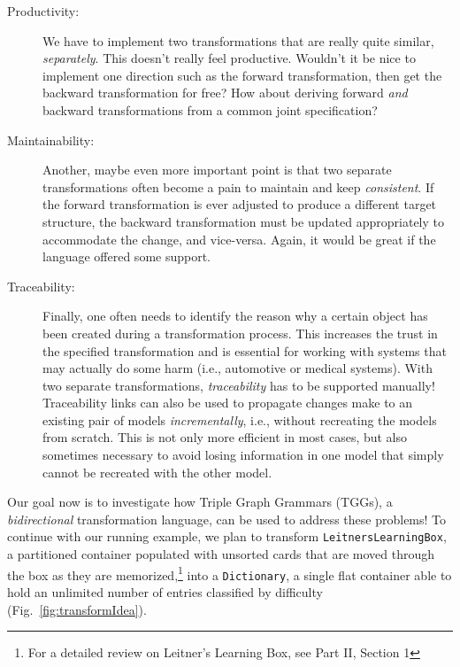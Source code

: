 \begin{description}
\item[Productivity:] We have to implement two transformations that are really quite similar, \emph{separately}. This doesn't really feel productive.
Wouldn't it be nice to implement one direction such as the forward transformation, then get the backward transformation for free? How about deriving
forward \emph{and} backward transformations from a common joint specification?

\item[Maintainability:] Another, maybe even more important point is that two separate transformations often become a pain to maintain and keep
\emph{consistent}. If the forward transformation is ever adjusted to produce a different target structure, the backward transformation must be updated
appropriately to accommodate the change, and vice-versa.  Again, it would be great if the language offered some support.

\item[Traceability:] Finally, one often needs to identify the reason why a certain object has been created during a transformation process. This increases the
trust in the specified transformation and is essential for working with systems that may actually do some harm (i.e., automotive or medical     
systems). With two separate transformations, \emph{traceability} has to be supported manually! Traceability links can also be used to propagate changes make to
an existing pair of models \emph{incrementally}, i.e., without recreating the models from scratch. This is not only more efficient in most cases, but also
sometimes necessary to avoid losing information in one model that simply cannot be recreated with the other model.
\end{description}

Our goal now is to investigate how Triple Graph Grammars (TGGs), a \emph{bidirectional} transformation language, can be used to address these problems!
To continue with our running example, we plan to transform \texttt{Leit\-ners\-Learn\-ing\-Box}, a partitioned container populated with unsorted
cards that are moved through the box as they are memorized,\footnote{For a detailed review on Leitner's Learning Box, see Part II, Section 1} into a
\texttt{Dictionary}, a single flat container able to hold an unlimited number of entries classified by difficulty (Fig.~\ref{fig:transformIdea}). 

\vspace{0.5cm}

